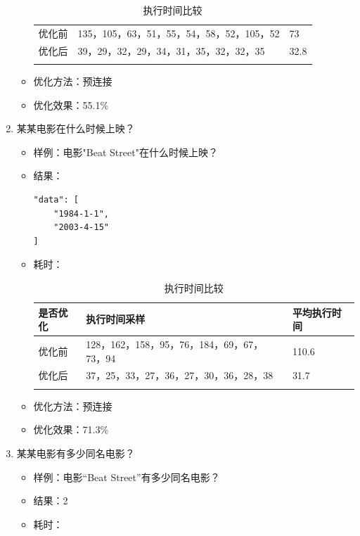 \documentclass{ctexrep}
\begin{document}
\begin{enumerate}
\begin{itemize}
\begin{longtable}{l|p{5cm}|l}
    	                    \hline
    	                    \hline
    	                    优化前 & 135，105，63，51，55，54，58，52，105，52 & 73\\
    	                    优化后 & 39，29，32，29，34，31，35，32，32，35 & 32.8\\
    	                    \hline
    	                    \caption{执行时间比较}
    	                \end{longtable}
    	            \item 优化方法：预连接
    	            \item 优化效果：55.1\%
    	        \end{itemize}
    	    \item 某某电影在什么时候上映？
    	        \begin{itemize}
    	            \item 样例：电影"Beat Street"在什么时候上映？
    	            \item 结果：
    	                \begin{lstlisting}
"data": [
    "1984-1-1",
    "2003-4-15"
]
    	                \end{lstlisting}
    	            \item 耗时：
    	                \begin{longtable}{l|p{5cm}|l}
    	                    \hline
    	                    是否优化 & 执行时间采样 & 平均执行时间\\
    	                    \hline
    	                    \hline
    	                    优化前 & 128，162，158，95，76，184，69，67，73，94 & 110.6\\
    	                    优化后 & 37，25，33，27，36，27，30，36，28，38 & 31.7\\
    	                    \hline
    	                    \caption{执行时间比较}
    	                \end{longtable}
    	            \item 优化方法：预连接
    	            \item 优化效果：71.3\%
    	        \end{itemize}
    	    \item 某某电影有多少同名电影？
    	        \begin{itemize}
    	            \item 样例：电影“Beat Street”有多少同名电影？
    	            \item 结果：2
    	            \item 耗时：

\end{itemize}
\end{enumerate}
\end{document}
